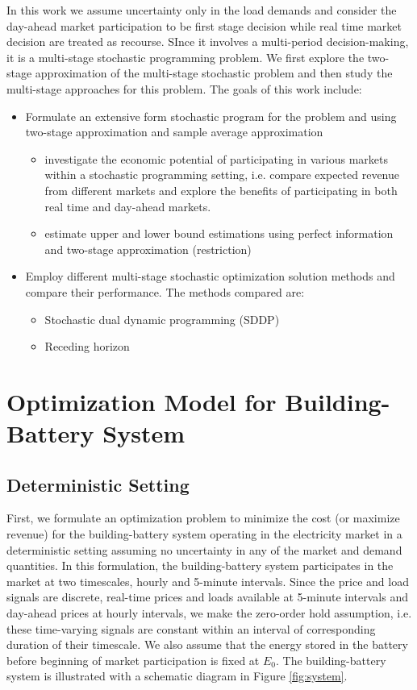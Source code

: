 \documentclass[11pt,twoside]{article}
\begin{document}
In this work we assume uncertainty only in the load demands and consider the day-ahead market participation to be first stage decision while real time market decision are treated as recourse. SInce it involves a multi-period decision-making, it is a multi-stage stochastic programming problem. We first explore the two-stage approximation of the multi-stage stochastic problem and then study the multi-stage approaches for this problem. The goals of this work include:
\begin{itemize}
\item Formulate an extensive form stochastic program for the problem and using two-stage approximation and sample average approximation
\begin{itemize}
\item investigate the economic potential of participating in various markets within a stochastic programming setting, i.e. compare expected revenue from different markets and explore the benefits of participating in both real time and day-ahead markets.
\item estimate upper and lower bound estimations using perfect information and two-stage approximation (restriction)
\end{itemize}
\item Employ different multi-stage stochastic optimization solution methods and compare their performance. The methods compared are:
\begin{itemize}
\item Stochastic dual dynamic programming (SDDP)
\item Receding horizon 
\end{itemize}
\end{itemize}

\section{Optimization Model for Building-Battery System}\label{sec:model}
\subsection{Deterministic Setting}\label{subsec:deterministic}
First, we formulate an optimization problem to minimize the cost (or maximize revenue) for the building-battery system operating in the electricity market in a deterministic setting assuming no uncertainty in any of the market and demand quantities. In this formulation, the building-battery system participates in the market at two timescales, hourly and 5-minute intervals. Since the price and load signals are discrete, real-time prices and loads available at 5-minute intervals and day-ahead prices at hourly intervals, we make the zero-order hold assumption, i.e. these time-varying signals are constant within an interval of corresponding duration of their timescale. We also assume that the energy stored in the battery before beginning of market participation is fixed at $E_{0}$. The building-battery system is illustrated with a schematic diagram in Figure \ref{fig:system}.
\end{document}
